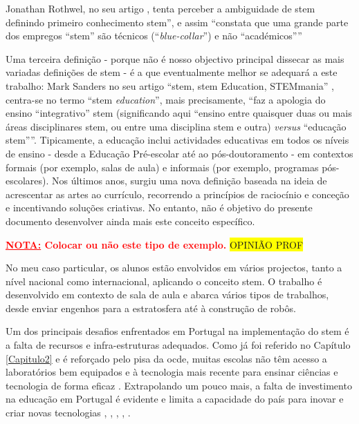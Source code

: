 Jonathan Rothwel, no seu artigo \cite{TheHidde2:online}, tenta perceber a ambiguidade de \acrshort{stem} definindo primeiro conhecimento \acrshort{stem}'', e assim ``constata que uma grande parte dos empregos ``\acrshort{stem}'' são técnicos (``\textit{blue-collar}'') e não ``académicos''''

Uma terceira definição - porque não é nosso objectivo principal dissecar as mais variadas definições de \acrshort{stem} - é a que eventualmente melhor se adequará a este trabalho: Mark Sanders no seu artigo ``\acrshort{stem}, \acrshort{stem} Education, STEMmania'' \cite{TTTSTEMA77:online}, centra-se no termo ``\acrshort{stem} \textit{education}'', mais precisamente, ``faz a apologia do ensino ``integrativo'' \acrshort{stem} (significando aqui ``ensino entre quaisquer duas ou mais áreas disciplinares  \acrshort{stem}, ou entre uma disciplina \acrshort{stem} e outra) \textit{versus} ``educação \acrshort{stem}''''.
Tipicamente, a educação inclui actividades educativas em todos os níveis de ensino - desde a Educação Pré-escolar até ao pós-doutoramento - em contextos formais (por exemplo, salas de aula) e informais (por exemplo, programas pós-escolares). Nos últimos anos, surgiu uma nova definição baseada na ideia de acrescentar as artes ao currículo, recorrendo a princípios de raciocínio e conceção e incentivando soluções criativas. No entanto, não é objetivo do presente documento desenvolver ainda mais este conceito específico.

\textcolor{red}{\textbf{\underline{NOTA:} Colocar ou não este tipo de exemplo.}}
\colorbox{yellow}{OPINIÃO PROF}

No meu caso particular, os alunos estão envolvidos em vários projectos, tanto a nível nacional como internacional, aplicando o conceito \acrshort{stem}. O trabalho é desenvolvido em contexto de sala de aula e abarca vários tipos de trabalhos, desde enviar engenhos para a estratosfera até à construção de robôs.



Um dos principais desafios enfrentados em Portugal na implementação do \acrshort{stem} é a falta de recursos e infra-estruturas adequados. Como já foi referido no Capítulo \ref{Capitulo2} e é reforçado pelo \acrfull{pisa} da \acrfull{ocde}, muitas escolas não têm acesso a laboratórios bem equipados e à tecnologia mais recente para ensinar ciências e tecnologia de forma eficaz \cite{pisa2018}. Extrapolando um pouco mais, a falta de investimento na educação em Portugal é evidente e limita a capacidade do país para inovar e criar novas tecnologias \cite{Oquefalt37:online}, \cite{Faltadei99:online}, \cite{Odesinve56:online}, \cite{EDUSTATP20:online}, \cite{Portugal69:online}.

